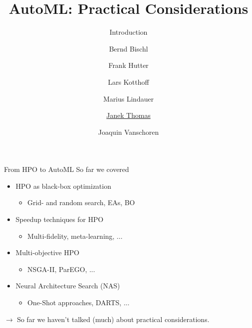 

\usepackage[normalem]{ulem}
\usepackage{pifont}
\usepackage{relsize}
\renewcommand{\lit}[1]{{\smaller\color{black!60}[#1]}}
\title[AutoML: Practical]{AutoML: Practical Considerations} 
\subtitle{Introduction}
\author[Janek Thomas]{Bernd Bischl \and Frank Hutter \and Lars Kotthoff\newline \and Marius Lindauer \and \underline{Janek Thomas} \and Joaquin Vanschoren}



\maketitle



\begin{frame}{From HPO to AutoML}
  So far we covered
  \begin{itemize}
    \item HPO as black-box optimization
    \begin{itemize}
      \item Grid- and random search, EAs, BO
    \end{itemize}
    \item Speedup techniques for HPO
    \begin{itemize}
      \item Multi-fidelity, meta-learning, ...
    \end{itemize}
    \item Multi-objective HPO
    \begin{itemize}
      \item NSGA-II, ParEGO, ...
    \end{itemize}
    \item Neural Architecture Search (NAS)
    \begin{itemize}
      \item One-Shot approaches, DARTS, ...
    \end{itemize}
  \end{itemize}
  
  \vspace{1cm}

  $\longrightarrow$ So far we haven't talked (much) about practical considerations.

\end{frame}

